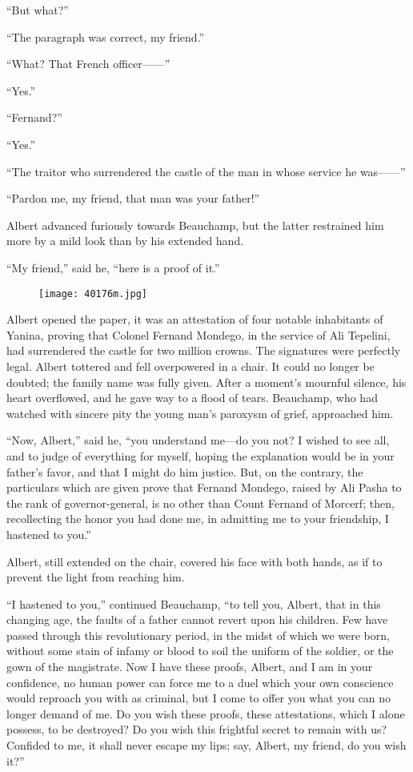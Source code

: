 “But what?”

“The paragraph was correct, my friend.”

“What? That French officer——”

“Yes.”

“Fernand?”

“Yes.”

“The traitor who surrendered the castle of the man in whose service he
was——”

“Pardon me, my friend, that man was your father!”

Albert advanced furiously towards Beauchamp, but the latter restrained
him more by a mild look than by his extended hand.

“My friend,” said he, “here is a proof of it.”

\begin{figure}[ht]
\texttt{[image: 40176m.jpg]}
\end{figure}

Albert opened the paper, it was an attestation of four notable
inhabitants of Yanina, proving that Colonel Fernand Mondego, in the
service of Ali Tepelini, had surrendered the castle for two million
crowns. The signatures were perfectly legal. Albert tottered and fell
overpowered in a chair. It could no longer be doubted; the family name
was fully given. After a moment’s mournful silence, his heart
overflowed, and he gave way to a flood of tears. Beauchamp, who had
watched with sincere pity the young man’s paroxysm of grief, approached
him.

“Now, Albert,” said he, “you understand me—do you not? I wished to see
all, and to judge of everything for myself, hoping the explanation
would be in your father’s favor, and that I might do him justice. But,
on the contrary, the particulars which are given prove that Fernand
Mondego, raised by Ali Pasha to the rank of governor-general, is no
other than Count Fernand of Morcerf; then, recollecting the honor you
had done me, in admitting me to your friendship, I hastened to you.”

Albert, still extended on the chair, covered his face with both hands,
as if to prevent the light from reaching him.

“I hastened to you,” continued Beauchamp, “to tell you, Albert, that in
this changing age, the faults of a father cannot revert upon his
children. Few have passed through this revolutionary period, in the
midst of which we were born, without some stain of infamy or blood to
soil the uniform of the soldier, or the gown of the magistrate. Now I
have these proofs, Albert, and I am in your confidence, no human power
can force me to a duel which your own conscience would reproach you
with as criminal, but I come to offer you what you can no longer demand
of me. Do you wish these proofs, these attestations, which I alone
possess, to be destroyed? Do you wish this frightful secret to remain
with us? Confided to me, it shall never escape my lips; say, Albert, my
friend, do you wish it?”

